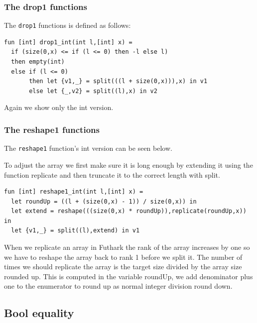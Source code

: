 \documentclass[11pt]{article}
\begin{document}
\subsubsection{The drop1 functions}
The {\tt drop1} functions is defined as follows: 
\begin{lstlisting}[language=Futhark]
fun [int] drop1_int(int l,[int] x) =
  if (size(0,x) <= if (l <= 0) then -l else l)
  then empty(int)
  else if (l <= 0)
       then let {v1,_} = split(((l + size(0,x))),x) in v1
       else let {_,v2} = split((l),x) in v2
\end{lstlisting}
Again we show only the int version. 

\subsubsection{The reshape1 functions}
The {\tt reshape1} function's int version can be seen below.

To adjust the array we first make sure it is long enough by extending it using the function replicate and then
truncate it to the correct length with split.

\begin{lstlisting}[language=Futhark]
fun [int] reshape1_int(int l,[int] x) =
  let roundUp = ((l + (size(0,x) - 1)) / size(0,x)) in
  let extend = reshape(((size(0,x) * roundUp)),replicate(roundUp,x)) in
  let {v1,_} = split((l),extend) in v1
\end{lstlisting}

When we replicate an array in Futhark the rank of the array increases by one so we have to reshape the array back to rank 1 before we split it.
The number of times we should replicate the array is the target size divided by the array size rounded up.
This is computed in the variable roundUp, we add denominator plus one to the enumerator to round up as normal integer division round down.


\subsection{Bool equality}
\end{document}
